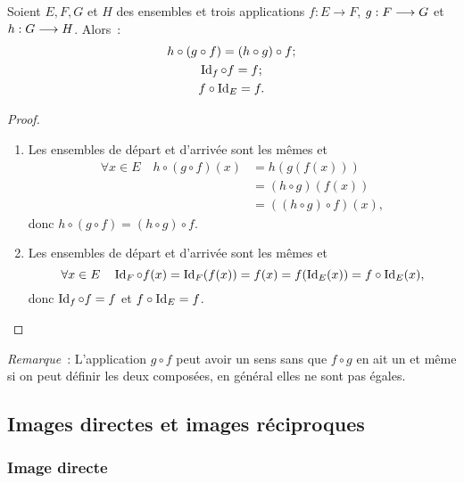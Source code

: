 \begin{prop}
    Soient \(E,F,G\) et \(H\) des ensembles et trois applications \(f:E 
    \longrightarrow F\), \(g:F \longrightarrow G\) et \(h:G \longrightarrow H\). 
    Alors~:
    \begin{gather}
        h \circ (g \circ f)=(h \circ g) \circ f;\\
        \operatorname{Id}_f \circ f = f;\\
        f \circ \operatorname{Id}_E=f.
    \end{gather}
\end{prop}
\begin{proof}
    \begin{enumerate}
        \item Les ensembles de départ et d'arrivée sont les mêmes et 
            \begin{align}
                \forall x \in E \quad h \circ (g \circ f)(x) &=h(g(f(x))) \\ 
                                                             &=(h \circ g)(f(x)) \\ 
                                                             &=((h \circ g) 
                                                             \circ f)(x),
            \end{align}
            donc \(h \circ (g \circ f)=(h \circ g) \circ f\).
        \item Les ensembles de départ et d'arrivée sont les mêmes et 
            \begin{equation}
                \forall x \in E \quad \operatorname{Id}_F \circ 
                f(x)=\operatorname{Id}_F(f(x))=f(x)=f(\operatorname{Id}_E(x))=f \circ \operatorname{Id}_E(x),
            \end{equation}
            donc \(\operatorname{Id}_f \circ f = f\) et \(f \circ \operatorname{Id}_E=f\).
    \end{enumerate}
\end{proof}

\emph{Remarque}~: L'application \(g \circ f\) peut avoir un sens sans que \(f 
\circ g\) en ait un et même si on peut définir les deux composées, en général 
elles ne sont pas égales.

\subsection{Images directes et images réciproques}
\label{chap3-subsec:imagesdirecteetrec}

\subsubsection{Image directe}
\label{chap3-subsec:imagedirecte}

